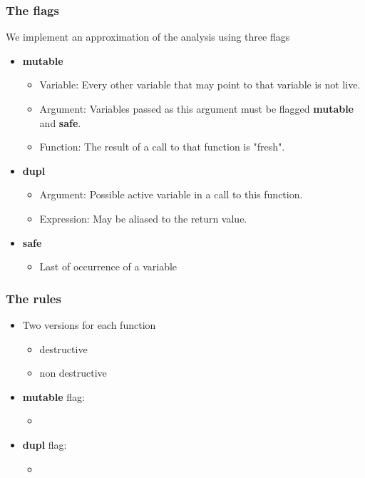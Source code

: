 \documentclass{beamer}
\begin{document}
\begin{frame}
\frametitle{The flags}
We implement an approximation of the analysis using three flags
\begin{itemize}
\itemsep1.5em
\item \textbf{mutable}
\begin{itemize}
\item Variable: Every other variable that may point to that variable is not live.
\item Argument: Variables passed as this argument must be flagged \textbf{mutable} and \textbf{safe}.
\item Function: The result of a call to that function is "fresh".
\end{itemize}
\item \textbf{dupl}
\begin{itemize}
\item Argument: Possible active variable in a call to this function.
\item Expression: May be aliased to the return value.
\end{itemize}
\item \textbf{safe}
\begin{itemize}
\item Last of occurrence of a variable
\end{itemize}
\end{itemize}

\end{frame}


\begin{frame}
\frametitle{The rules}
\begin{itemize}
\itemsep1em
\item Two versions for each function
\begin{itemize}
\item destructive
\item non destructive
\end{itemize}
\item \textbf{mutable} flag:
\begin{itemize}
\itemsep0em
\item 
\end{itemize}
\item \textbf{dupl} flag:
\begin{itemize}
\itemsep0em
\item 
\end{itemize}
\end{itemize}
\end{frame}
\end{document}
